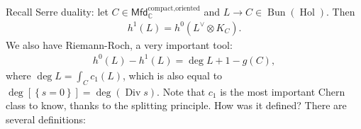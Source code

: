 \begin{remark}

Recall Serre duality: let
\(C\in {\mathsf{Mfd}}_{\mathbb{C}}^{{ \text{compact} } ,{ \text{oriented} } }\)
and \(L\to C \in \mathop{\mathrm{Bun}}(\mathop{\mathrm{Hol}})\). Then
\begin{align*}
h^1(L) = h^0(L^\vee\otimes K_C)
.\end{align*}
We also have Riemann-Roch, a very important tool:
\begin{align*}
h^0(L) - h^1(L) = \deg L + 1 - g(C)
,\end{align*}
where \(\deg L = \int_C c_1(L)\), which is also equal to
\(\deg [ \left\{{ s = 0 }\right\}] = \deg(\operatorname{Div}s)\). Note
that \(c_1\) is the most important Chern class to know, thanks to the
splitting principle. How was it defined? There are several definitions:


\end{remark}
